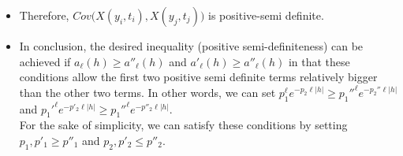 \documentclass[11pt]{article}
\begin{document}
\begin{itemize}
\begin{align*}
\\
&\text{Now, let } \quad a_\ell(h), a'_\ell(h \ge a''_\ell(h) \ge 0. \quad \text{Then,}\\
& \sum_{i=1}^n \sum_{j=1}^n c_i c_j \sum_{\ell=1}^{\infty} \sum_{m=-\ell}^{\ell}  a_{\ell}(h_{ij}) Y_{\ell}^{m}(y_i) Y_{\ell}^{m}(y_j) + \sum_{i=1}^n \sum_{j=1}^n c_i c_j Y_{0}^{0}(y_i) Y_{0}^{0}(y_j) \sum_{\ell=1}^{\infty} \sum_{m=-\ell}^{\ell} a'_\ell(h_{ij}) Y_{\ell}^{m}(\tau) Y_{\ell}^{m}(\tau)\\
&\ge -\biggl( \sum_{i=1}^n \sum_{j=1}^n c_i c_j Y_{0}^{0}(y_i) \sum_{\ell=1}^{\infty} \sum_{m=-\ell}^{\ell}  a''_{\ell}(h_{ij}) Y_{\ell}^{m}(\tau) Y_{\ell}^{m}(y_j) + \sum_{i=1}^n \sum_{j=1}^n c_i c_j Y_{0}^{0}(y_j) \sum_{\ell=1}^{\infty} \sum_{m=-\ell}^{\ell}  a''_{\ell}(h_{ij}) Y_{\ell}^{m}(y_i) Y_{\ell}^{m}(\tau) \biggl)\\
\\
&\Rightarrow \sum_{i=1}^n \sum_{j=1}^n c_i c_j \sum_{\ell=1}^{\infty} \sum_{m=-\ell}^{\ell}  a_{\ell}(h_{ij}) Y_{\ell}^{m}(y_i) Y_{\ell}^{m}(y_j) + \sum_{i=1}^n \sum_{j=1}^n c_i c_j Y_{0}^{0}(y_i) Y_{0}^{0}(y_j) \sum_{\ell=1}^{\infty} \sum_{m=-\ell}^{\ell} a'_\ell(h_{ij}) Y_{\ell}^{m}(\tau) Y_{\ell}^{m}(\tau)\\
&+ \sum_{i=1}^n \sum_{j=1}^n c_i c_j Y_{0}^{0}(y_i) \sum_{\ell=1}^{\infty} \sum_{m=-\ell}^{\ell}  a''_{\ell}(h_{ij}) Y_{\ell}^{m}(\tau) Y_{\ell}^{m}(y_j) + \sum_{i=1}^n \sum_{j=1}^n c_i c_j Y_{0}^{0}(y_j) \sum_{\ell=1}^{\infty} \sum_{m=-\ell}^{\ell}  a''_{\ell}(h_{ij}) Y_{\ell}^{m}(y_i) Y_{\ell}^{m}(\tau) \ge 0
\end{align*}

\item
Therefore, $Cov\biggl(X(y_i,t_i), X(y_j,t_j)\biggl)$ is positive-semi definite.\\

\item
In conclusion, the desired inequality (positive semi-definiteness) can be achieved if $a_\ell(h) \ge a''_\ell(h)$ and $a'_\ell(h) \ge a''_\ell(h)$ in that these conditions allow the first two positive semi definite terms relatively bigger than the other two terms. In other words, we can set  $p_1^\ell e^{-p_2 \ell |h|} \ge p_1''^\ell e^{-p_2'' \ell |h|}$ and $p_1'^{\ell} e^{-p'_2 \ell |h|} \ge p_1''^\ell e^{-p''_2 \ell |h|}$.\\
For the sake of simplicity, we can satisfy these conditions by setting $p_1, p'_1 \ge p''_1$ and $p_2, p'_2 \le p''_2$.\\




\end{itemize}
\end{document}
